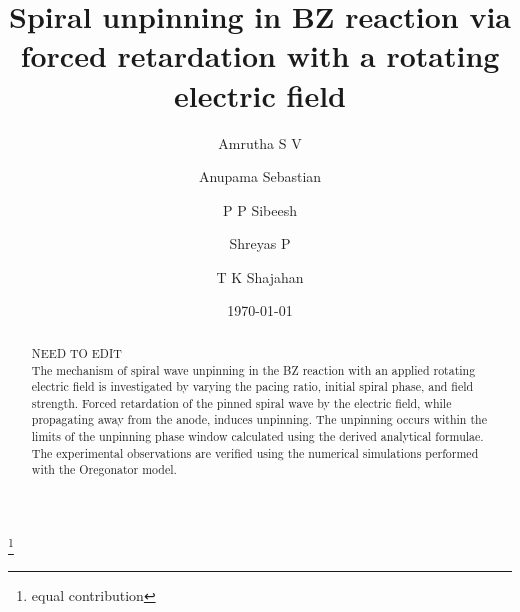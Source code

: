 \documentclass[%
 reprint,
 amsmath,amssymb,
 aps,
prb,
]{revtex4-2}
\begin{document}

\title{Spiral unpinning in BZ reaction via forced retardation with a rotating electric field }%


\author{Amrutha S V}
\thanks{equal contribution}%
\author{Anupama Sebastian}%

\author{P P Sibeesh}
\author{Shreyas P}
\author{T K Shajahan}


\date{\today}%

\begin{abstract}
	NEED TO EDIT\\
The mechanism of spiral wave unpinning in the BZ reaction with an applied rotating electric field is investigated by varying the pacing ratio, initial spiral phase, and field strength. Forced retardation of the pinned spiral wave by the electric field, while propagating away from the anode, induces unpinning. The unpinning occurs within the limits of the unpinning phase window calculated using the derived analytical formulae. The experimental observations are verified using the numerical simulations performed with the Oregonator model.
\end{abstract}

                             
\maketitle
\end{document}
